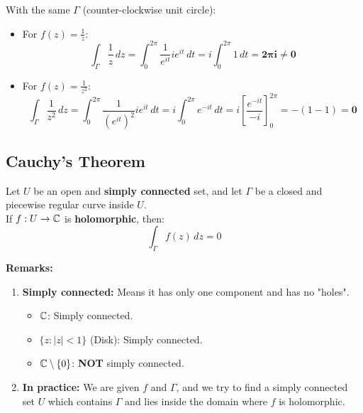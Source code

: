 \begin{example}
With the same $\Gamma$ (counter-clockwise unit circle):
\begin{itemize}
    \item For $f(z) = \frac{1}{z}$:
    \[ \int_{\Gamma} \frac{1}{z} \, dz = \int_0^{2\pi} \frac{1}{e^{it}} i e^{it} \, dt = i \int_0^{2\pi} 1 \, dt = \mathbf{2\pi i \neq 0} \]
    \item For $f(z) = \frac{1}{z^2}$:
    \[ \int_{\Gamma} \frac{1}{z^2} \, dz = \int_0^{2\pi} \frac{1}{(e^{it})^2} i e^{it} \, dt = i \int_0^{2\pi} e^{-it} \, dt = i \left[ \frac{e^{-it}}{-i} \right]_0^{2\pi} = -(1 - 1) = \mathbf{0} \]
\end{itemize}
\end{example}

\subsection{Cauchy's Theorem}

\begin{theorem}[Theorem]
Let $U$ be an open and \textbf{simply connected} set, and let $\Gamma$ be a closed and piecewise regular curve inside $U$. \\
If $f : U \rightarrow \mathbb{C}$ is \textbf{holomorphic}, then:
\[
\int_{\Gamma} f(z) \, dz = 0
\]
\end{theorem}

\textbf{Remarks:}
\begin{enumerate}
    \item \textbf{Simply connected:} Means it has only one component and has no "holes".
    \begin{itemize}
        \item $\mathbb{C}$: Simply connected.
        \item $\{z : |z| < 1\}$ (Disk): Simply connected.
        \item $\mathbb{C} \setminus \{0\}$: \textbf{NOT} simply connected.
    \end{itemize}
    \item \textbf{In practice:} We are given $f$ and $\Gamma$, and we try to find a simply connected set $U$ which contains $\Gamma$ and lies inside the domain where $f$ is holomorphic.
\end{enumerate}

